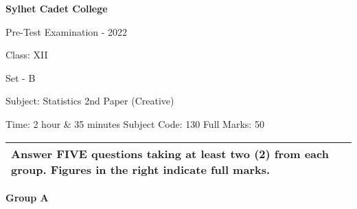 \documentclass{article}
\begin{document}
\begin{center}
  \bfseries\large
  Sylhet Cadet College

\normalsize
  Pre-Test Examination - 2022

  Class: XII
  
  Set - B

  Subject: Statistics 2nd Paper (Creative) 

  Time: 2 hour \& 35 minutes \qquad \qquad \qquad Subject Code: 130  \qquad  \qquad \qquad Full Marks: 50

\end{center}

\noindent
\begin{tabular}{p{\dimexpr\linewidth-2\tabcolsep}}
  Answer FIVE questions taking at least two (2) from each group. Figures in the right indicate full marks.\\
  \hline
\end{tabular}

\begin{center}
\textbf{Group A}
\end{center}
\end{document}
